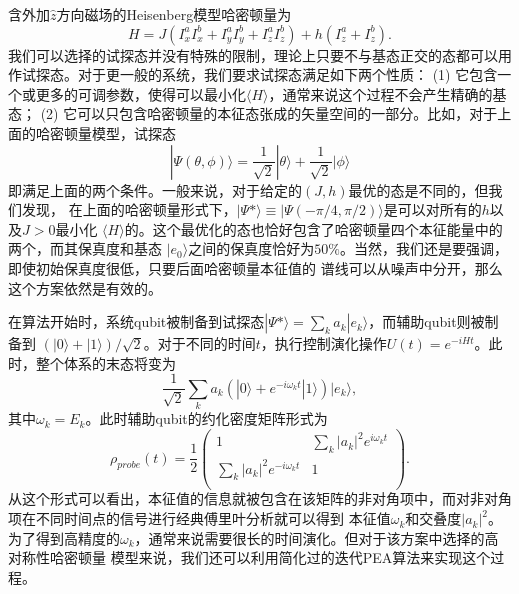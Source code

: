 含外加$\hat{z}$方向磁场的Heisenberg模型哈密顿量为
 \begin{equation}
H = J(I_x^aI_x^b+I_y^aI_y^b+I_z^aI_z^b)+h(I_z^a+I_z^b).
\end{equation}
我们可以选择的试探态并没有特殊的限制，理论上只要不与基态正交的态都可以用作试探态。对于更一般的系统，我们要求试探态满足如下两个性质：
(1) 它包含一个或更多的可调参数，使得可以最小化$\langle H\rangle$，通常来说这个过程不会产生精确的基态；
(2) 它可以只包含哈密顿量的本征态张成的矢量空间的一部分。比如，对于上面的哈密顿量模型，试探态
 \begin{equation}
|\Psi(\theta,\phi)\rangle = \frac{1}{\sqrt{2}}|\theta\rangle+\frac{1}{\sqrt{2}}|\phi\rangle
\end{equation}
即满足上面的两个条件。一般来说，对于给定的$(J, h)$最优的态是不同的，但我们发现，
在上面的哈密顿量形式下，$|\Psi\ast\rangle \equiv|\Psi(-\pi/4,\pi/2)\rangle$是可以对所有的$h$以及$J>0$最小化
$\langle H\rangle$的。这个最优化的态也恰好包含了哈密顿量四个本征能量中的两个，而其保真度和基态
$|e_0\rangle $之间的保真度恰好为$50\%$。当然，我们还是要强调，即使初始保真度很低，只要后面哈密顿量本征值的
谱线可以从噪声中分开，那么这个方案依然是有效的。

在算法开始时，系统qubit被制备到试探态$|\Psi\ast\rangle = \sum_k a_k |e_k\rangle$，而辅助qubit则被制备到
$(|0\rangle+|1\rangle)/\sqrt{2}$。对于不同的时间$t$，执行控制演化操作$U(t) = e^{-iHt}$。此时，整个体系的末态将变为
\begin{equation}
\frac{1}{\sqrt{2}}\sum_k a_k(|0\rangle+e^{-i\omega_k t}|1\rangle)|e_k\rangle ,
\end{equation}
其中$\omega_k = E_k$。此时辅助qubit的约化密度矩阵形式为
\begin{equation}
\rho_{probe}(t)=\frac{1}{2}\left(
                             \begin{array}{cc}
                               1 & \sum_k |a_k|^2e^{i\omega_k t}  \\
                               \sum_k |a_k|^2e^{-i\omega_k t} & 1 \\
                             \end{array}
                           \right).
\end{equation}
从这个形式可以看出，本征值的信息就被包含在该矩阵的非对角项中，而对非对角项在不同时间点的信号进行经典傅里叶分析就可以得到
本征值$\omega_k$和交叠度$|a_k|^2$。为了得到高精度的$\omega_k$，通常来说需要很长的时间演化。但对于该方案中选择的高对称性哈密顿量
模型来说，我们还可以利用简化过的迭代PEA算法来实现这个过程。

